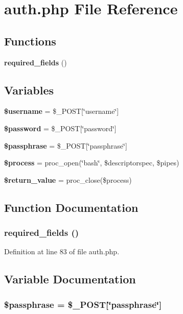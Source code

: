 \section{auth.php File Reference}
\label{auth_8php}
\subsection*{Functions}
\begin{CompactItemize}
\item 
{\bf required\_\-fields} ()
\end{CompactItemize}
\subsection*{Variables}
\begin{CompactItemize}
\item 
{\bf \$username} = \$\_\-POST[\char`\"{}username\char`\"{}]
\item 
{\bf \$password} = \$\_\-POST[\char`\"{}password\char`\"{}]
\item 
{\bf \$passphrase} = \$\_\-POST[\char`\"{}passphrase\char`\"{}]
\item 
{\bf \$process} = proc\_\-open(\char`\"{}bash\char`\"{}, \$descriptorspec, \$pipes)
\item 
{\bf \$return\_\-value} = proc\_\-close(\$process)
\end{CompactItemize}


\subsection{Function Documentation}
\subsubsection{\setlength{\rightskip}{0pt plus 5cm}required\_\-fields ()}\label{auth_8php_a5}




Definition at line 83 of file auth.php.

\subsection{Variable Documentation}
\subsubsection{\setlength{\rightskip}{0pt plus 5cm}\$passphrase = \$\_\-POST[\char`\"{}passphrase\char`\"{}]}\label{auth_8php_a2}




